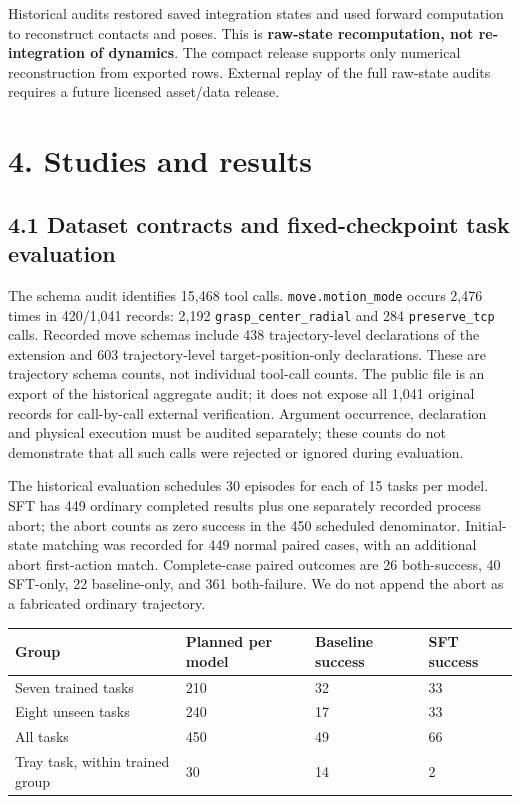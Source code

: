 \documentclass[10pt]{article}
\begin{document}
Historical audits restored saved integration states and used forward computation to reconstruct contacts and poses. This is \textbf{raw-state recomputation, not re-integration of dynamics}. The compact release supports only numerical reconstruction from exported rows. External replay of the full raw-state audits requires a future licensed asset/data release.

\section*{4. Studies and results}

\subsection*{4.1 Dataset contracts and fixed-checkpoint task evaluation}

The schema audit identifies 15,468 tool calls. \texttt{move.motion\_mode} occurs 2,476 times in 420/1,041 records: 2,192 \texttt{grasp\_center\_radial} and 284 \texttt{preserve\_tcp} calls. Recorded move schemas include 438 trajectory-level declarations of the extension and 603 trajectory-level target-position-only declarations. These are trajectory schema counts, not individual tool-call counts. The public file is an export of the historical aggregate audit; it does not expose all 1,041 original records for call-by-call external verification. Argument occurrence, declaration and physical execution must be audited separately; these counts do not demonstrate that all such calls were rejected or ignored during evaluation.

The historical evaluation schedules 30 episodes for each of 15 tasks per model. SFT has 449 ordinary completed results plus one separately recorded process abort; the abort counts as zero success in the 450 scheduled denominator. Initial-state matching was recorded for 449 normal paired cases, with an additional abort first-action match. Complete-case paired outcomes are 26 both-success, 40 SFT-only, 22 baseline-only, and 361 both-failure. We do not append the abort as a fabricated ordinary trajectory.

\par\noindent\begin{minipage}{\linewidth}\centering\small\setlength{\tabcolsep}{4pt}\begin{tabular}{p{}p{}p{}p{}}\hline
Group & Planned per model & Baseline success & SFT success \\ \hline
Seven trained tasks & 210 & 32 & 33 \\
Eight unseen tasks & 240 & 17 & 33 \\
All tasks & 450 & 49 & 66 \\
Tray task, within trained group & 30 & 14 & 2 \\
\hline\end{tabular}\end{minipage}\par\medskip
\end{document}
